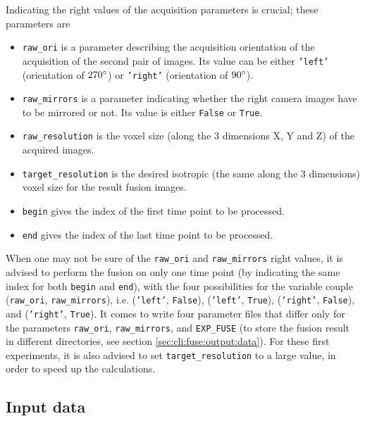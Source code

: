 Indicating the right values of the
acquisition parameters is crucial; these parameters are
\begin{itemize}
\itemsep -0.5ex
\item \texttt{raw\_ori} is a parameter describing the acquisition
  orientation of the acquisition of the second pair of images. Its value can be either \texttt{'left'} (orientation of
  $270 \degree$) or \texttt{'right'} (orientation of
  $90 \degree$).
\item \texttt{raw\_mirrors} is a parameter indicating whether the
  right camera images have to be mirrored or not. Its value is either
  \texttt{False} or \texttt{True}.
\item \texttt{raw\_resolution} is the voxel size (along the 3
    dimensions X, Y and Z) of the acquired images.
\item \texttt{target\_resolution} is the desired isotropic (the
    same along the 3 dimensions) voxel size for the result fusion
    images.
\item \texttt{begin} gives the index of the first time point to be
  processed.
\item \texttt{end} gives the index of the last time point to be processed.
\end{itemize}


When one may not be sure of the \texttt{raw\_ori} and
\texttt{raw\_mirrors} right values, it is advised to perform the
fusion on only one time point (by indicating the same index for both
\texttt{begin}  and \texttt{end}), with the four possibilities for the
variable couple (\texttt{raw\_ori}, \texttt{raw\_mirrors}), i.e.
(\texttt{'left'}, \texttt{False}),
(\texttt{'left'}, \texttt{True}),
(\texttt{'right'}, \texttt{False}), and
(\texttt{'right'}, \texttt{True}).
It comes to write four parameter files that differ only for the
parameters \texttt{raw\_ori}, \texttt{raw\_mirrors}, and
\texttt{EXP\_FUSE}  (to store the fusion result in different
directories, see section \ref{sec:cli:fuse:output:data}).
For these first experiments, it is also advised to set
\texttt{target\_resolution} to a large value, in order to speed up the
calculations.



\subsection{Input data}
\label{sec:cli:fuse:input:data}

